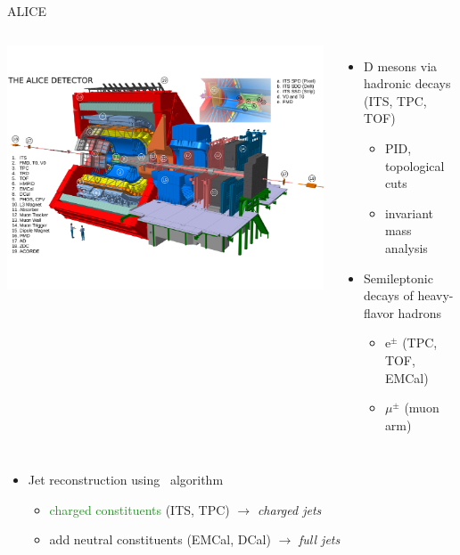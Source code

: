 \documentclass[xcolor={usenames,dvipsnames}]{beamer}
\begin{document}
\begin{frame}{ALICE}
\begin{columns}

\includegraphics[width=\textwidth]{img/ALICE_Schematics}

\small
\begin{itemize}
\item \alert{D mesons} via hadronic decays (ITS, TPC, TOF)
\begin{itemize}
\item PID, topological cuts
\item invariant mass analysis
\end{itemize}
\item Semileptonic decays of heavy-flavor hadrons
\begin{itemize}
\item \alert{e$^{\pm}$} (TPC, TOF, EMCal)
\item \alert{$\mu^{\pm}$} (muon arm)
\end{itemize}
\end{itemize}
\end{columns}
\begin{itemize}
\item \alert{Jet reconstruction} using \antikt\ algorithm
\begin{itemize}
\item \textcolor{ForestGreen}{charged constituents} (ITS, TPC) $\rightarrow$ \emph{charged jets}
\item add \textcolor{NavyBlue}{neutral constituents} (EMCal, DCal) $\rightarrow$ \emph{full jets} 
\end{itemize}
\end{itemize}
\end{frame}
\end{document}
